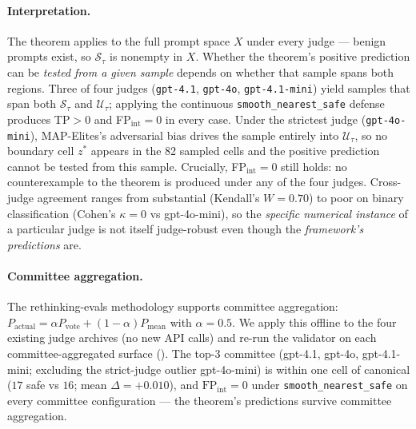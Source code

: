 \documentclass[11pt]{article}
\begin{document}
\paragraph{Interpretation.} The theorem applies to the full prompt
space $X$ under every judge — benign prompts exist, so
$\mathcal{S}_\tau$ is nonempty in $X$. Whether the theorem's positive
prediction can be \emph{tested from a given sample} depends on whether
that sample spans both regions. Three of four judges
(\texttt{gpt-4.1}, \texttt{gpt-4o}, \texttt{gpt-4.1-mini}) yield samples
that span both $\mathcal{S}_\tau$ and $\mathcal{U}_\tau$; applying the
continuous \texttt{smooth\_nearest\_safe} defense produces
TP$>0$ and FP$_{\mathrm{int}}=0$ in every case. Under the strictest
judge (\texttt{gpt-4o-mini}), MAP-Elites's adversarial bias drives the
sample entirely into $\mathcal{U}_\tau$, so no boundary cell $z^*$
appears in the 82 sampled cells and the positive prediction cannot be
tested from this sample. Crucially, FP$_{\mathrm{int}}=0$ still holds:
no counterexample to the theorem is produced under any of the four
judges. Cross-judge agreement ranges from substantial (Kendall's
$W=0.70$) to poor on binary classification (Cohen's $\kappa=0$ vs
gpt-4o-mini), so the \emph{specific numerical instance} of a particular
judge is not itself judge-robust even though the \emph{framework's
predictions} are.

\paragraph{Committee aggregation.}
The rethinking-evals methodology supports committee aggregation:
$P_{\mathrm{actual}} = \alpha P_{\mathrm{vote}} + (1-\alpha) P_{\mathrm{mean}}$
with $\alpha=0.5$. We apply this offline to the four existing judge
archives (no new API calls) and re-run the validator on each
committee-aggregated surface (). The
top-3 committee (gpt-4.1, gpt-4o, gpt-4.1-mini; excluding the
strict-judge outlier gpt-4o-mini) is within one cell of canonical
($17$ safe vs $16$; mean $\Delta=+0.010$), and
$\mathrm{FP}_{\mathrm{int}}=0$ under \texttt{smooth\_nearest\_safe}
on every committee configuration --- the theorem's predictions
survive committee aggregation.

\begin{table}[h]
\centering
\small
\caption{Judge committee aggregations vs the canonical single-judge
surface. Top-3 committee is within one cell of canonical;
$\mathrm{FP}_{\mathrm{int}}=0$ in every configuration.}
\label{tab:judge-committee}

\end{table}
\end{document}
